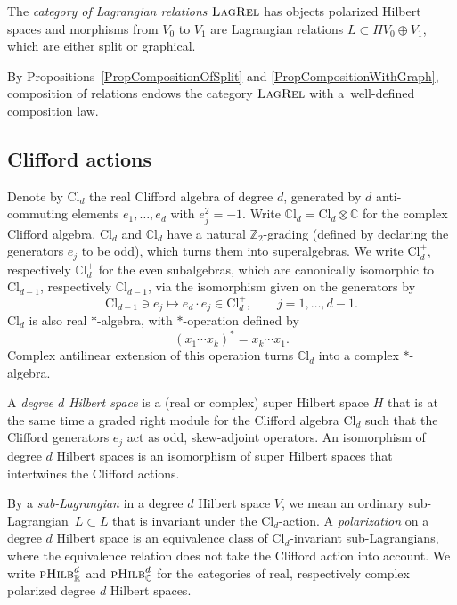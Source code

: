 \documentclass[10pt,a4paper]{amsart}
\numberwithin{equation}{section}
\newcommand{\LagRel}{\textsc{LagRel}}
\newcommand{\pHilb}{\textsc{pHilb}}
\newcommand{\R}{\mathbb{R}}
\newcommand{\Z}{\mathbb{Z}}
\newcommand{\C}{\mathbb{C}}
\newcommand{\Cl}{\mathrm{Cl}}
\newcommand{\CCl}{\mathbb{C}\mathrm{l}}
\begin{document}
\begin{Definition}
\label{DefinitionCatLagRel}
The \emph{category of Lagrangian relations} $\LagRel$ has objects polarized Hilbert spaces and morphisms from $V_0$ to $V_1$ are Lagrangian relations $L \subset \Pi V_0 \oplus V_1$, which are either split or graphical.
\end{Definition}

By Propositions~\ref{PropCompositionOfSplit} and \ref{PropCompositionWithGraph}, composition of relations endows the category $\LagRel$ with a~well-defined composition law.

\subsection{Clifford actions}

Denote by $\Cl_{d}$ the real Clifford algebra of degree $d$, generated by $d$ anti-commuting elements $e_1, \dots, e_d$ with $e_j^2 = -1$.
Write $\CCl_d = \Cl_d \otimes \C$ for the complex Clifford algebra.
$\Cl_d$ and $\CCl_d$ have a natural $\Z_2$-grading (defined by declaring the generators $e_j$ to be odd), which turns them into superalgebras.
We write $\Cl_d^+$, respectively $\CCl_d^+$ for the even subalgebras, which are canonically isomorphic to $\Cl_{d-1}$, respectively $\CCl_{d-1}$, via the isomorphism given on the generators by
\begin{equation} \label{IsomorphismCliffordDimensionShift}
\Cl_{d-1} \ni e_j \mapsto e_d \cdot e_j \in \Cl_d^+, \qquad j=1, \dots, d-1.
\end{equation}
$\Cl_d$ is also real $*$-algebra, with $*$-operation defined by
\begin{equation*}
 (x_1 \cdots x_k)^* = x_k \cdots x_1.
\end{equation*}
Complex antilinear extension of this operation turns $\CCl_d$ into a complex $*$-algebra.

\begin{Definition}
A \emph{degree $d$ Hilbert space} is a (real or complex) super Hilbert space $H$ that is at the same time a graded right module for the Clifford algebra $\Cl_d$ such that the Clifford generators $e_j$ act as odd, skew-adjoint operators.
An isomorphism of degree $d$ Hilbert spaces is an isomorphism of super Hilbert spaces that intertwines the Clifford actions.
\end{Definition}

By a \emph{sub-Lagrangian} in a degree $d$ Hilbert space $V$, we mean an ordinary sub-Lagrangian~${L \!\subset\! L}$ that is invariant under the $\Cl_d$-action.
A \emph{polarization} on a degree $d$ Hilbert space is an equivalence class of $\Cl_d$-invariant sub-Lagrangians, where the equivalence relation does not take the Clifford action into account.
We write $\pHilb^d_\R$ and $\pHilb^d_\C$ for the categories of real, respectively complex polarized degree $d$ Hilbert spaces.
\end{document}
